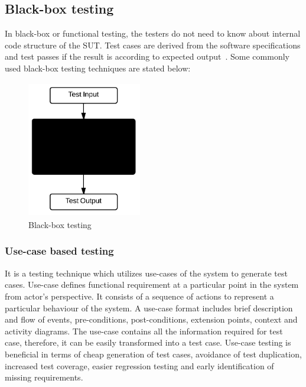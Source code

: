 \subsection{Black-box testing}
In black-box or functional testing, the testers do not need to know about internal code structure of the SUT. Test cases are derived from the software specifications and test passes if the result is according to expected output~\cite{beizer1995black}. Some commonly used black-box testing techniques are stated below:
\begin{figure}[h]
\begin{center}
	\includegraphics[width=5cm, height=6cm ]{chapter2/blackBox.png}
	\caption{Black-box testing}
 	\label{fig:blackBox}
\end{center}  
\end{figure}
\subsubsection{Use-case based testing}
It is a testing technique which utilizes use-cases of the system to generate test cases. Use-case defines functional requirement at a particular point in the system from actor's perspective. It consists of a sequence of actions to represent a particular behaviour of the system. A use-case format includes brief description and flow of events, pre-conditions, post-conditions, extension points, context and activity diagrams. The use-case contains all the information required for test case, therefore, it can be easily transformed into a test case. Use-case testing is beneficial in terms of cheap generation of test cases, avoidance of test duplication, increased test coverage, easier regression testing and early identification of missing requirements.  

